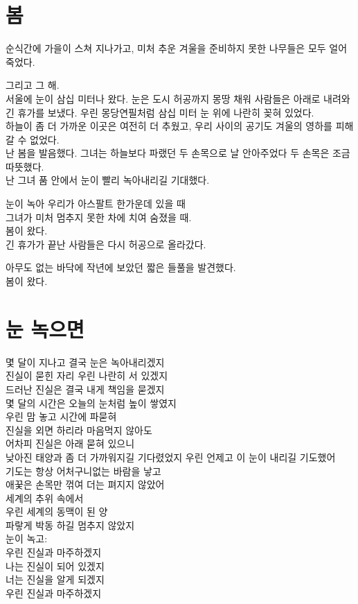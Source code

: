 \begin{article}
\hypertarget{uxbd04}{%
\chapter{봄}\label{uxbd04}}

순식간에 가을이 스쳐 지나가고, 미처 추운 겨울을 준비하지 못한 나무들은 모두 얼어 죽었다.

그리고 그 해.\\
서울에 눈이 삼십 미터나 왔다. 눈은 도시 허공까지 몽땅 채워 사람들은 아래로 내려와 긴 휴가를 보냈다. 우린 몽당연필처럼 삼십 미터 눈 위에 나란히 꽂혀 있었다.\\
하늘이 좀 더 가까운 이곳은 여전히 더 추웠고, 우리 사이의 공기도 겨울의 영하를 피해갈 수 없었다.\\
난 봄을 발음했다. 그녀는 하늘보다 파랬던 두 손목으로 날 안아주었다 두 손목은 조금 따뜻했다.\\
난 그녀 품 안에서 눈이 빨리 녹아내리길 기대했다.

눈이 녹아 우리가 아스팔트 한가운데 있을 때\\
그녀가 미처 멈추지 못한 차에 치여 숨졌을 때.\\
봄이 왔다.\\
긴 휴가가 끝난 사람들은 다시 허공으로 올라갔다.

아무도 없는 바닥에 작년에 보았던 짧은 들풀을 발견했다.\\
봄이 왔다.
\end{article}

\begin{article}
\hypertarget{uxb208-uxb179uxc73cuxba74}{%
\chapter{눈 녹으면}\label{uxb208-uxb179uxc73cuxba74}}

몇 달이 지나고 결국 눈은 녹아내리겠지\\
진실이 묻힌 자리 우린 나란히 서 있겠지\\
드러난 진실은 결국 내게 책임을 묻겠지\\
몇 달의 시간은 오늘의 눈처럼 높이 쌓였지\\
우린 맘 놓고 시간에 파묻혀\\
진실을 외면 하리라 마음먹지 않아도\\
어차피 진실은 아래 묻혀 있으니\\
낮아진 태양과 좀 더 가까워지길 기다렸었지 우린 언제고 이 눈이 내리길 기도했어\\
기도는 항상 어처구니없는 바람을 낳고\\
애꿎은 손목만 꺾여 더는 펴지지 않았어\\
세계의 추위 속에서\\
우린 세계의 동맥이 된 양\\
파랗게 박동 하길 멈추지 않았지\\
눈이 녹고:\\
우린 진실과 마주하겠지\\
나는 진실이 되어 있겠지\\
너는 진실을 알게 되겠지\\
우린 진실과 마주하겠지
\end{article}

